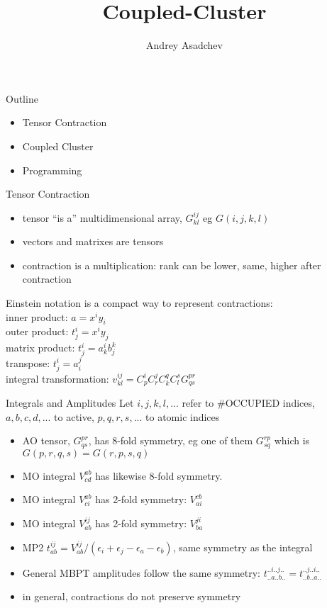 \documentclass{beamer}
\title[Coupled-Cluster]{Coupled-Cluster}
\author{ Andrey Asadchev}
\institute{Iowa State University}
\begin{document}
\begin{frame}
  \titlepage
\end{frame}


\begin{frame}{Outline}
  \begin{itemize}
  \item Tensor Contraction
  \item Coupled Cluster
  \item Programming
  \end{itemize}
\end{frame}

\begin{frame}{Tensor Contraction}
  \begin{itemize}
  \item tensor ``is a'' multidimensional array, $G^{ij}_{kl}$ eg $G(i,j,k,l)$
  \item vectors and matrixes are tensors
  \item  contraction  is a multiplication: rank can be lower, same,
    higher after contraction
  \end{itemize}
  Einstein notation is a compact way to represent contractions:\\
  inner product: $a = x^i y_i$ \\
  outer product: $t^i_j = x^i y_j$ \\
  matrix product: $t^i_j = a^i_k b^k_j$ \\
  transpose: $t^i_j = a^j_i$ \\
  integral transformation: $v^{ij}_{kl} = C^i_p C^j_r C^q_k C^s_l G^{pr}_{qs}$ \\
\end{frame}


\begin{frame}{Integrals and Amplitudes}
  Let $i,j,k,l,...$  refer to \#OCCUPIED indices, $a,b,c,d,...$ to
  active, $ p,q,r,s,...$ to atomic indices
  \begin{itemize}
  \item AO tensor, $G^{pr}_{qs}$, has 8-fold symmetry, eg one of them
    $G^{rp}_{sq}$  which is $G(p,r,q,s) = G(r,p,s,q)$
  \item MO integral $V^{ab}_{cd}$ has likewise 8-fold symmetry.
  \item MO integral $V^{ab}_{ci}$ has 2-fold symmetry: $V^{cb}_{ai}$
  \item MO integral $V^{ij}_{ab}$ has 2-fold symmetry: $V^{ji}_{ba}$
  \item  MP2 $t^{ij}_{ab} = V^{ij}_{ab}/(\epsilon_i + \epsilon_j -
    \epsilon_a - \epsilon_b)$, same symmetry as the integral
  \item General MBPT amplitudes  follow the same symmetry:
    $t^{..i..j..}_{..a..b..} = t^{..j..i..}_{..b..a..}$
  \item in general, contractions do not preserve symmetry
  \end{itemize}
\end{frame}
\end{document}
